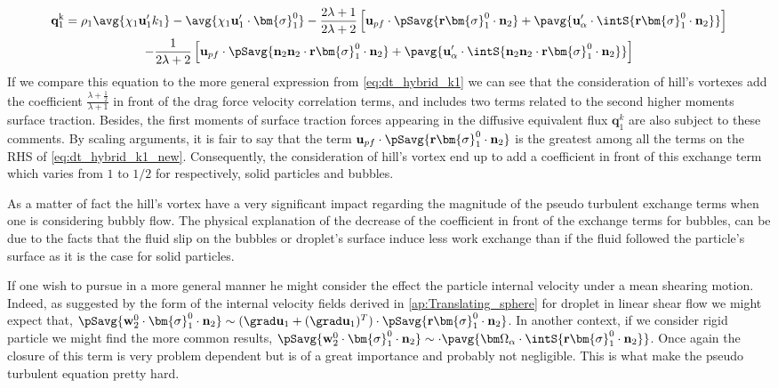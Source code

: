 \begin{multline*}
    \textbf{q}_1^\text{k}
    = \rho_1 \avg{\chi_1 \textbf{u}_1' k_1} 
    - \avg{\chi_1 \textbf{u}_1' \cdot \bm{\sigma}_1^0}
    - \frac{2\lambda +1}{2\lambda +2} 
    \left[
        \textbf{u}_{pf}
        \cdot \pSavg{\textbf{r}\bm{\sigma}_1^0 \cdot \textbf{n}_2}
        + \pavg{ \textbf{u}_\alpha' \cdot \intS{ \textbf{r} \bm{\sigma}_1^0 \cdot \textbf{n}_2}}
    \right]\\
    - \frac{1}{2\lambda+2}\left[
        \textbf{u}_{p f} \cdot\pSavg{\textbf{n}_2\textbf{n}_2\cdot \textbf{r}\bm{\sigma}_1^0\cdot\textbf{n}_2}
        +
        \pavg{\textbf{u}_{\alpha}' \cdot \intS{\textbf{n}_2\textbf{n}_2\cdot \textbf{r}\bm{\sigma}_1^0\cdot\textbf{n}_2}}
    \right]
\end{multline*}
If we compare this equation to the more general expression from \ref{eq:dt_hybrid_k1} we can see that the consideration of hill's vortexes add the coefficient $\frac{\lambda +\frac{1}{2}}{\lambda+1}$ in front of the drag force velocity correlation terms, and includes two terms related to the second higher moments surface traction. 
Besides, the first moments of surface traction forces appearing in the diffusive equivalent flux $\textbf{q}_1^k$ are also subject to these comments.  
By scaling arguments, it is fair to say that the term  $\textbf{u}_{pf} \cdot \pSavg{\textbf{r}\bm{\sigma}_1^0 \cdot \textbf{n}_2}$ is the greatest among all the terms on the RHS of \ref{eq:dt_hybrid_k1_new}. 
Consequently, the consideration of hill's vortex end up to add a coefficient in front of this exchange term which varies from $1$ to $1/2$ for respectively, solid particles and bubbles.  

As a matter of fact the hill's vortex have a very significant impact regarding the magnitude of the pseudo turbulent exchange terms when one is considering bubbly flow. 
The physical explanation of the decrease of the coefficient in front of the exchange terms for bubbles, can be due to the facts that the fluid slip on the bubbles or droplet's surface induce less work exchange than if the fluid followed the particle's surface as it is the case for solid particles. 

If one wish to pursue in a more general manner he might consider the effect the particle internal velocity under a mean shearing motion. 
Indeed, as suggested by the form of the internal velocity fields derived in \ref{ap:Translating_sphere} for droplet in linear shear flow we might expect that, 
$\pSavg{\textbf{w}_2^0 \cdot \bm{\sigma}_1^0\cdot\textbf{n}_2} \sim (\grad \textbf{u}_1 + (\grad \textbf{u}_1)^T) \cdot \pSavg{ \textbf{r} \bm{\sigma}_1^0\cdot\textbf{n}_2}$. 
In another context, if we consider rigid particle we might find the more common results, $\pSavg{\textbf{w}_2^0 \cdot \bm{\sigma}_1^0\cdot\textbf{n}_2} \sim \cdot \pavg{\bm\Omega_\alpha\cdot \intS{ \textbf{r} \bm{\sigma}_1^0\cdot\textbf{n}_2}}$. 
Once again the closure of this term is very problem dependent but is of a great importance and probably not negligible. 
This is what make the pseudo turbulent equation pretty hard. 